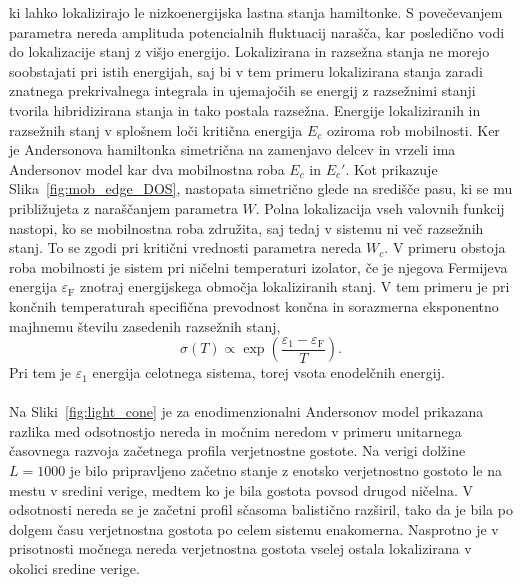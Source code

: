 \documentclass[10pt,a4paper]{article}
\begin{document}
ki lahko lokalizirajo le nizkoenergijska lastna stanja hamiltonke. S povečevanjem parametra nereda amplituda potencialnih fluktuacij narašča, kar posledično vodi do lokalizacije stanj z višjo energijo. Lokalizirana in razsežna stanja ne morejo soobstajati pri istih energijah, saj bi v tem primeru lokalizirana stanja zaradi znatnega prekrivalnega integrala in ujemajočih se energij z razsežnimi stanji tvorila hibridizirana stanja in tako postala razsežna. Energije lokaliziranih in razsežnih stanj v splošnem loči kritična energija $E_c$ oziroma rob mobilnosti. Ker je Andersonova hamiltonka simetrična na zamenjavo delcev in vrzeli ima Andersonov model kar dva mobilnostna roba $E_c$ in $E_c'$. Kot prikazuje Slika~\ref{fig:mob_edge_DOS}, nastopata simetrično glede na središče pasu, ki se mu približujeta z naraščanjem parametra $W$. Polna lokalizacija vseh valovnih funkcij nastopi, ko se mobilnostna roba združita, saj tedaj v sistemu ni več razsežnih stanj. To se zgodi pri kritični vrednosti parametra nereda $W_c$. V primeru obstoja roba mobilnosti je sistem pri ničelni temperaturi izolator, če je njegova Fermijeva energija $\varepsilon_\mathrm{F}$ znotraj energijskega območja lokaliziranih stanj. V tem primeru je pri končnih temperaturah specifična prevodnost končna in sorazmerna eksponentno majhnemu številu zasedenih razsežnih stanj,
\begin{equation}
\sigma(T)\propto \exp\left(\frac{\varepsilon_1 - \varepsilon_\mathrm{F}}{T}\right).
\end{equation}
Pri tem je $\varepsilon_1$ energija celotnega sistema, torej vsota enodelčnih energij.  \\\\
Na Sliki~\ref{fig:light_cone} je za enodimenzionalni Andersonov model prikazana razlika med odsotnostjo nereda in močnim neredom v primeru unitarnega časovnega razvoja začetnega profila verjetnostne gostote. Na verigi dolžine $L=1000$ je bilo pripravljeno začetno stanje z enotsko verjetnostno gostoto le na mestu v sredini verige, medtem ko je bila gostota povsod drugod ničelna. V odsotnosti nereda se je začetni profil sčasoma balistično razširil, tako da je bila po dolgem času verjetnostna gostota po celem sistemu enakomerna. Nasprotno je v prisotnosti močnega nereda verjetnostna gostota vselej ostala lokalizirana v okolici sredine verige. 
\end{document}

